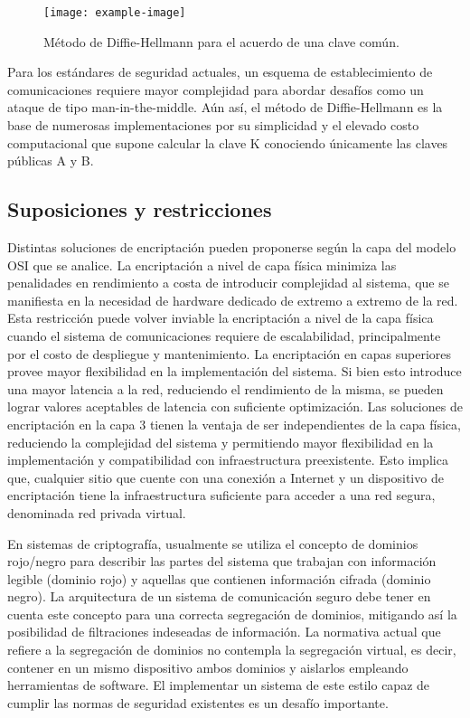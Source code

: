 \begin{figure}[h!]
    \centering
    \texttt{[image: example-image]}
    \caption{Método de Diffie-Hellmann para el acuerdo de una clave común.}
    \label{fig:diffie-hellmann}
\end{figure}

Para los estándares de seguridad actuales, un esquema de establecimiento de comunicaciones requiere mayor complejidad para abordar desafíos como un ataque de tipo man-in-the-middle. Aún así, el método de Diffie-Hellmann es la base de numerosas implementaciones por su simplicidad y el elevado costo computacional que supone calcular la clave K conociendo únicamente las claves públicas A y B.

\subsection{Suposiciones y restricciones}
Distintas soluciones de encriptación pueden proponerse según la capa del modelo OSI que se analice. La encriptación a nivel de capa física minimiza las penalidades en rendimiento a costa de introducir complejidad al sistema, que se manifiesta en la necesidad de hardware dedicado de extremo a extremo de la red. Esta restricción puede volver inviable la encriptación a nivel de la capa física cuando el sistema de comunicaciones requiere de escalabilidad, principalmente por el costo de despliegue y mantenimiento.
La encriptación en capas superiores provee mayor flexibilidad en la implementación del sistema. Si bien esto introduce una mayor latencia a la red, reduciendo el rendimiento de la misma, se pueden lograr valores aceptables de latencia con suficiente optimización.  
Las soluciones de encriptación en la capa 3 tienen la ventaja de ser independientes de la capa física, reduciendo la complejidad del sistema y permitiendo mayor flexibilidad en la implementación y compatibilidad con infraestructura preexistente. Esto implica que, cualquier sitio que cuente con una conexión a Internet y un dispositivo de encriptación tiene la infraestructura suficiente para acceder a una red segura, denominada red privada virtual.

En sistemas de criptografía, usualmente se utiliza el concepto de dominios rojo/negro para describir las partes del sistema que trabajan con información legible (dominio rojo) y aquellas que contienen información cifrada (dominio negro). La arquitectura de un sistema de comunicación seguro debe tener en cuenta este concepto para una correcta segregación de dominios, mitigando así la posibilidad de filtraciones indeseadas de información. La normativa actual que refiere a la segregación de dominios no contempla la segregación virtual, es decir, contener en un mismo dispositivo ambos dominios y aislarlos empleando herramientas de software. El implementar un sistema de este estilo capaz de cumplir las normas de seguridad existentes es un desafío importante.



